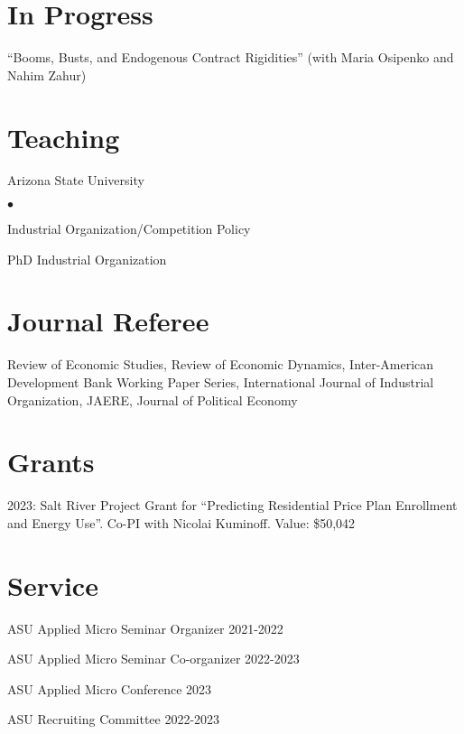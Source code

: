 \documentclass[margin,line]{res}
\newenvironment{list1}{
  \begin{list}{\ding{113}}{%
      \setlength{\itemsep}{.025in}
      \setlength{\parsep}{0in} \setlength{\parskip}{0in}
      \setlength{\topsep}{0in} \setlength{\partopsep}{0in}
      \setlength{\leftmargin}{0.17in}}}{\end{list}}
\newenvironment{list2}{
  \begin{list}{$\bullet$}{%
      \setlength{\itemsep}{0in}
      \setlength{\parsep}{0in} \setlength{\parskip}{0in}
      \setlength{\topsep}{0in} \setlength{\partopsep}{0in}
      \setlength{\leftmargin}{0.2in}}}{\end{list}}
\begin{document}
\begin{resume}
\section{In Progress}
\begin{list1}
	\item[] ``Booms, Busts, and Endogenous Contract Rigidities'' (with Maria Osipenko and Nahim Zahur)
\end{list1}

\section{Teaching}
\begin{list1}
	\item[] Arizona State University
	\begin{list2}
		\item[] Industrial Organization/Competition Policy 
		\item[] PhD Industrial Organization 
	\end{list2}
\end{list1}

\section{Journal Referee}
\begin{list1}
	\item[] Review of Economic Studies, Review of Economic Dynamics, Inter-American Development Bank Working Paper Series, International Journal of Industrial Organization, JAERE, Journal of Political Economy
\end{list1}

\section{Grants}
\begin{list1}
	\item[] 2023: Salt River Project Grant for ``Predicting Residential Price Plan Enrollment and Energy Use''. Co-PI with Nicolai Kuminoff. Value: \$50,042
\end{list1}

\section{Service}
\begin{list1}
	\item[] ASU Applied Micro Seminar Organizer 2021-2022
	\item[] ASU Applied Micro Seminar Co-organizer 2022-2023
	\item[] ASU Applied Micro Conference 2023
	\item[] ASU Recruiting Committee 2022-2023
\end{list1}


\end{resume}
\end{document}
